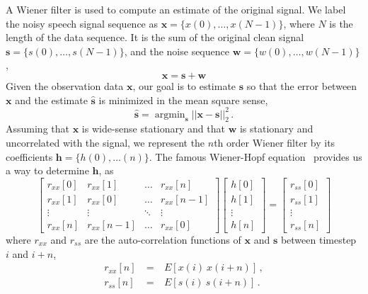 \documentclass[paper-main.tex]{subfiles}
\begin{document}
A Wiener filter is used to compute an estimate of the original signal. 
We label the noisy speech signal sequence as  $\mathbf{x}=\{x(0),\dots, x(N-1)\}$, where $N$ is the length of the data sequence. 
It is the sum of the original clean signal $\mathbf{s}=\{s(0),\dots,s(N-1)\}$, and the noise sequence $\mathbf{w}=\{w(0),\dots,w(N-1)\}$, 
\begin{equation}
    \mathbf{x}=\mathbf{s}+\mathbf{w}
\end{equation}
Given the observation data $\mathbf{x}$, our goal is to estimate $\mathbf{s}$ so that the error between $\mathbf{x}$ and the estimate ${\hat{\mathbf{s}}}$ is minimized in the mean square sense,
\begin{equation}
    \hat{\mathbf{s}}=\mathop{\arg\min}_{\textbf{s}}||\mathbf{x}-\mathbf{s}||_2^2\,. 
\end{equation}
Assuming that $\textbf{x}$ is wide-sense stationary  and that $\textbf{w}$ is stationary and uncorrelated with the signal, we represent the $n$th order Wiener filter by its coefficients $\textbf{h}=\{h(0),\dots(n)\}$. 
The famous Wiener-Hopf equation~\citep{noble1959methods} provides us a way to determine $\textbf{h}$, as
\begin{equation}
\label{eqn:winer-hopf}
\begin{bmatrix}  
r_{xx}[0]&r_{xx}[1]&\dots& r_{xx}[n]\\
r_{xx}[1]&r_{xx}[0]&\dots &r_{xx}[n-1]\\
\vdots&\vdots&\ddots&\vdots\\
r_{xx}[n]&r_{xx}[n-1]&\dots &r_{xx}[0]
\end{bmatrix}
\begin{bmatrix}
h[0]\\
h[1]\\
\vdots\\
h[n]
\end{bmatrix}=
\begin{bmatrix}
r_{ss}[0]\\
r_{ss}[1]\\
\vdots\\
r_{ss}[n]
\end{bmatrix}
\end{equation}
where $r_{xx}$ and $r_{ss}$ are the auto-correlation functions of $\mathbf{x}$ and $\mathbf{s}$ between timestep $i$ and $i+n$, 
\begin{eqnarray} 
r_{xx}[n] &~=~& E[x(i)~x(i+n)] \,,\\
r_{ss}[n] &~=~& E[s(i)~s(i+n)] \,.
\end{eqnarray} 
\end{document}
